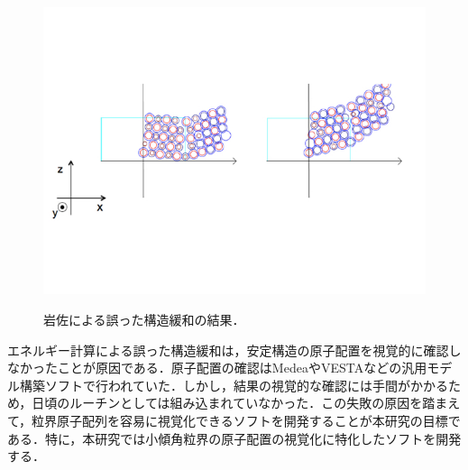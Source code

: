 \begin{figure}[htbp]\begin{center}
\includegraphics[width=12cm,bb= 0 0 937 753]{../figs/./boundary_narita.004.jpeg}
\caption{岩佐による誤った構造緩和の結果．}
\label{fig:004}
\label{default}\end{center}\end{figure}
エネルギー計算による誤った構造緩和は，安定構造の原子配置を視覚的に確認しなかったことが原因である．原子配置の確認はMedeaやVESTAなどの汎用モデル構築ソフトで行われていた．しかし，結果の視覚的な確認には手間がかかるため，日頃のルーチンとしては組み込まれていなかった．この失敗の原因を踏まえて，粒界原子配列を容易に視覚化できるソフトを開発することが本研究の目標である．特に，本研究では小傾角粒界の原子配置の視覚化に特化したソフトを開発する．

